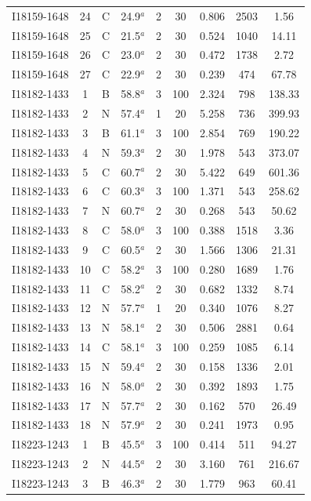 \begin{table}
\begin{tabular}{ccccccccc}
I18159-1648 & 24 & C & 24.9$^{a}$ & 2 & 30 & 0.806 & 2503 & 1.56 \\
I18159-1648 & 25 & C & 21.5$^{a}$ & 2 & 30 & 0.524 & 1040 & 14.11 \\
I18159-1648 & 26 & C & 23.0$^{a}$ & 2 & 30 & 0.472 & 1738 & 2.72 \\
I18159-1648 & 27 & C & 22.9$^{a}$ & 2 & 30 & 0.239 & 474 & 67.78 \\
I18182-1433 & 1 & B & 58.8$^{a}$ & 3 & 100 & 2.324 & 798 & 138.33 \\
I18182-1433 & 2 & N & 57.4$^{a}$ & 1 & 20 & 5.258 & 736 & 399.93 \\
I18182-1433 & 3 & B & 61.1$^{a}$ & 3 & 100 & 2.854 & 769 & 190.22 \\
I18182-1433 & 4 & N & 59.3$^{a}$ & 2 & 30 & 1.978 & 543 & 373.07 \\
I18182-1433 & 5 & C & 60.7$^{a}$ & 2 & 30 & 5.422 & 649 & 601.36 \\
I18182-1433 & 6 & C & 60.3$^{a}$ & 3 & 100 & 1.371 & 543 & 258.62 \\
I18182-1433 & 7 & N & 60.7$^{a}$ & 2 & 30 & 0.268 & 543 & 50.62 \\
I18182-1433 & 8 & C & 58.0$^{a}$ & 3 & 100 & 0.388 & 1518 & 3.36 \\
I18182-1433 & 9 & C & 60.5$^{a}$ & 2 & 30 & 1.566 & 1306 & 21.31 \\
I18182-1433 & 10 & C & 58.2$^{a}$ & 3 & 100 & 0.280 & 1689 & 1.76 \\
I18182-1433 & 11 & C & 58.2$^{a}$ & 2 & 30 & 0.682 & 1332 & 8.74 \\
I18182-1433 & 12 & N & 57.7$^{a}$ & 1 & 20 & 0.340 & 1076 & 8.27 \\
I18182-1433 & 13 & N & 58.1$^{a}$ & 2 & 30 & 0.506 & 2881 & 0.64 \\
I18182-1433 & 14 & C & 58.1$^{a}$ & 3 & 100 & 0.259 & 1085 & 6.14 \\
I18182-1433 & 15 & N & 59.4$^{a}$ & 2 & 30 & 0.158 & 1336 & 2.01 \\
I18182-1433 & 16 & N & 58.0$^{a}$ & 2 & 30 & 0.392 & 1893 & 1.75 \\
I18182-1433 & 17 & N & 57.7$^{a}$ & 2 & 30 & 0.162 & 570 & 26.49 \\
I18182-1433 & 18 & N & 57.9$^{a}$ & 2 & 30 & 0.241 & 1973 & 0.95 \\
I18223-1243 & 1 & B & 45.5$^{a}$ & 3 & 100 & 0.414 & 511 & 94.27 \\
I18223-1243 & 2 & N & 44.5$^{a}$ & 2 & 30 & 3.160 & 761 & 216.67 \\
I18223-1243 & 3 & B & 46.3$^{a}$ & 2 & 30 & 1.779 & 963 & 60.41 \\

\end{tabular}
\end{table}

